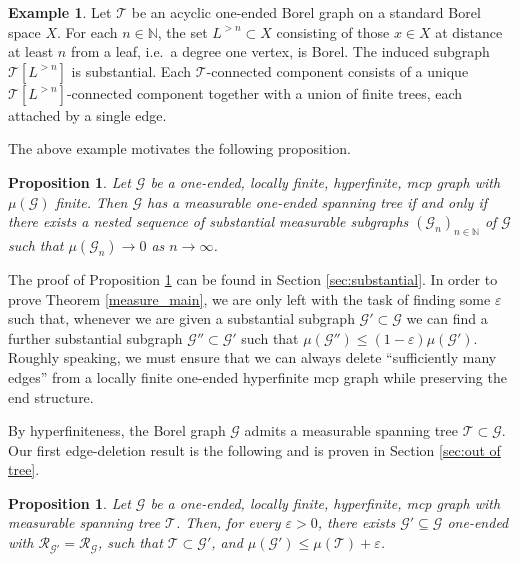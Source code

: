 \documentclass[letterpaper,11pt,reqno]{amsart}
\theoremstyle{bfnote}
\newtheorem{prop}[theorem]{Proposition}
\theoremstyle{definition}
\newtheorem{example}[theorem]{Example}
\newcommand{\0}{\varnothing}
\renewcommand{\epsilon}{\varepsilon}
\newcommand{\eps}{\epsilon}
\renewcommand{\leq}{\leqslant}
\numberwithin{equation}{section}
\begin{document}
\begin{example}\label{ex:substantial}
    Let $\mathcal T$ be an acyclic one-ended Borel graph on a standard Borel space $X$. For each $n\in \mathbb N$, the set $L^{>n}\subset X$ consisting of those $x\in X$ at distance at least $n$ from a leaf, i.e.\ a degree one vertex, is Borel. The induced subgraph $\mathcal T [L^{>n}]$ is substantial. Each $\mathcal T$-connected component consists of a unique $\mathcal T [L^{>n}]$-connected component together with a union of finite trees, each attached by a single edge.
\end{example}

The above example motivates the following proposition.

\begin{prop}\label{basic}
    Let $\mathcal{G}$ be a one-ended, locally finite, hyperfinite, mcp graph with $\mu(\mathcal{G})$ finite. Then $\mathcal{G}$ has a measurable one-ended spanning tree if and only if 
    there exists a nested sequence of substantial measurable subgraphs $(\mathcal G_n)_{n\in \mathbb N}$ of $\mathcal{G}$ such that $\mu(\mathcal{G}_n)\to0$ as $n\to\infty$.
\end{prop}

The proof of Proposition \ref{basic} can be found in Section \ref{sec:substantial}. In order to prove Theorem \ref{measure_main}, we are only left with the task of finding some $\eps$ such that, whenever we are given a substantial subgraph $\mathcal G' \subset \mathcal G$ we can find a further substantial subgraph $\mathcal G'' \subset \mathcal G'$ such that $\mu (\mathcal G'') \leq (1 - \eps) \mu (\mathcal G')$. Roughly speaking, we must ensure that we can always delete ``sufficiently many edges'' from a locally finite one-ended hyperfinite mcp graph while preserving the end structure. %

By hyperfiniteness, the Borel graph $\mathcal G$ admits a measurable spanning tree $\mathcal T \subset \mathcal G$. Our first edge-deletion result is the following and is proven in Section \ref{sec:out of tree}. 

\begin{prop}\label{tree measure}
    Let $\mathcal G$ be a one-ended, locally finite, hyperfinite, mcp graph with measurable spanning tree $\mathcal T$. Then, for every $\eps > 0$, there exists $\mathcal G' \subseteq \mathcal G$ one-ended with $\mathcal R_{\mathcal G'} = \mathcal R_{\mathcal G}$, such that $\mathcal T \subset \mathcal G'$, and $
    \mu( \mathcal G') \leq \mu (\mathcal T) + \eps$.
\end{prop}
\end{document}
